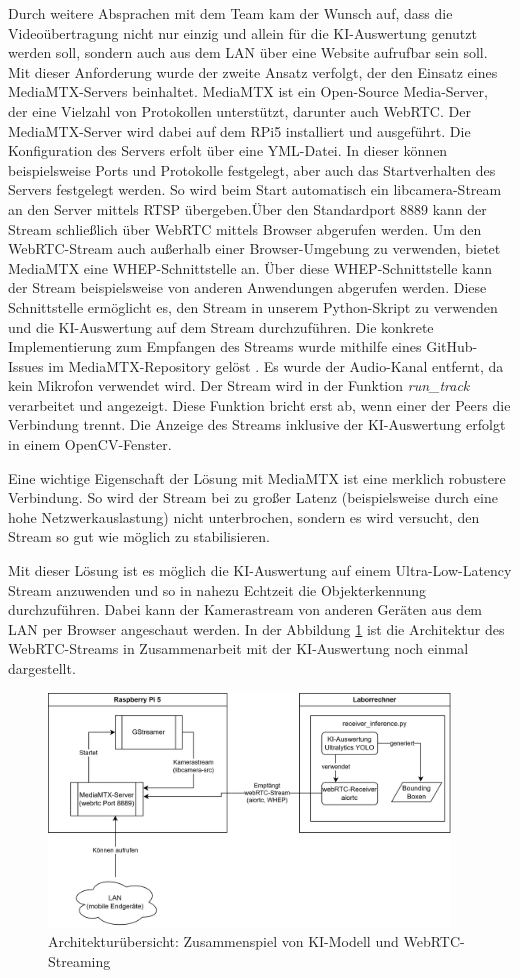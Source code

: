 Durch weitere Absprachen mit dem Team kam der Wunsch auf, dass die Videoübertragung nicht nur einzig und allein für die KI-Auswertung genutzt werden soll, sondern auch aus dem LAN über eine Website aufrufbar sein soll. Mit dieser Anforderung wurde der zweite Ansatz verfolgt, der den Einsatz eines MediaMTX-Servers beinhaltet. MediaMTX ist ein Open-Source Media-Server, der eine Vielzahl von Protokollen unterstützt, darunter auch WebRTC. Der MediaMTX-Server wird dabei auf dem RPi5 installiert und ausgeführt. Die Konfiguration des Servers erfolt über eine YML-Datei.
In dieser können beispielsweise Ports und Protokolle festgelegt, aber auch das Startverhalten des Servers festgelegt werden. So wird beim Start automatisch ein libcamera-Stream an den Server mittels RTSP übergeben.Über den Standardport 8889 kann der Stream schließlich über WebRTC mittels Browser abgerufen werden. Um den WebRTC-Stream auch außerhalb einer Browser-Umgebung zu verwenden, bietet MediaMTX eine WHEP-Schnittstelle an. Über diese WHEP-Schnittstelle kann der Stream beispielsweise von anderen Anwendungen abgerufen werden. Diese Schnittstelle ermöglicht es, den Stream in unserem Python-Skript zu verwenden und die KI-Auswertung auf dem Stream durchzuführen. Die konkrete Implementierung zum Empfangen des Streams wurde mithilfe eines GitHub-Issues im MediaMTX-Repository gelöst \cite{mediamtxwebrtc}. Es wurde der Audio-Kanal entfernt, da kein Mikrofon verwendet wird. Der Stream wird in der Funktion \textit{run\_track} verarbeitet und angezeigt. Diese Funktion bricht erst ab, wenn einer der Peers die Verbindung trennt. Die Anzeige des Streams inklusive der KI-Auswertung erfolgt in einem OpenCV-Fenster.

Eine wichtige Eigenschaft der Lösung mit MediaMTX ist eine merklich robustere Verbindung. So wird der Stream bei zu großer Latenz (beispielsweise durch eine hohe Netzwerkauslastung) nicht unterbrochen, sondern es wird versucht, den Stream so gut wie möglich zu stabilisieren. 

Mit dieser Lösung ist es möglich die KI-Auswertung auf einem Ultra-Low-Latency Stream anzuwenden und so in nahezu Echtzeit die Objekterkennung durchzuführen. Dabei kann der Kamerastream von anderen Geräten aus dem LAN per Browser angeschaut werden. In der Abbildung \ref{fig:KI-webRTC-Architektur} ist die Architektur des WebRTC-Streams in Zusammenarbeit mit der KI-Auswertung noch einmal dargestellt. 

\begin{figure}[H]
  \centering
  \includegraphics[width=0.95\textwidth]{images/ki-webrtc-arch.png}
  \caption{Architekturübersicht: Zusammenspiel von KI-Modell und WebRTC-Streaming}
  \label{fig:KI-webRTC-Architektur}
\end{figure}
